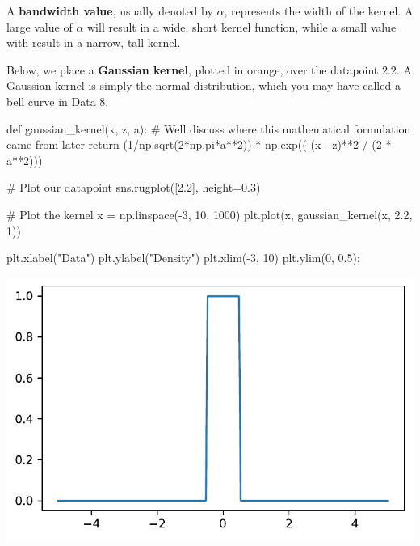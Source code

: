 \documentclass[
  letterpaper,
  DIV=11,
  numbers=noendperiod]{scrreprt}
\newenvironment{Shaded}{\begin{snugshade}}{\end{snugshade}}
\newcommand{\CommentTok}[1]{\textcolor[rgb]{0.37,0.37,0.37}{#1}}
\newcommand{\ControlFlowTok}[1]{\textcolor[rgb]{0.00,0.23,0.31}{#1}}
\newcommand{\DecValTok}[1]{\textcolor[rgb]{0.68,0.00,0.00}{#1}}
\newcommand{\FloatTok}[1]{\textcolor[rgb]{0.68,0.00,0.00}{#1}}
\newcommand{\KeywordTok}[1]{\textcolor[rgb]{0.00,0.23,0.31}{#1}}
\newcommand{\NormalTok}[1]{\textcolor[rgb]{0.00,0.23,0.31}{#1}}
\newcommand{\OperatorTok}[1]{\textcolor[rgb]{0.37,0.37,0.37}{#1}}
\newcommand{\StringTok}[1]{\textcolor[rgb]{0.13,0.47,0.30}{#1}}
\begin{document}
A \textbf{bandwidth value}, usually denoted by \(\alpha\), represents
the width of the kernel. A large value of \(\alpha\) will result in a
wide, short kernel function, while a small value with result in a
narrow, tall kernel.

Below, we place a \textbf{Gaussian kernel}, plotted in orange, over the
datapoint \(2.2\). A Gaussian kernel is simply the normal distribution,
which you may have called a bell curve in Data 8.

\begin{Shaded}
\begin{Highlighting}[]
\KeywordTok{def}\NormalTok{ gaussian\_kernel(x, z, a):}
    \CommentTok{\# We\textquotesingle{}ll discuss where this mathematical formulation came from later}
    \ControlFlowTok{return}\NormalTok{ (}\DecValTok{1}\OperatorTok{/}\NormalTok{np.sqrt(}\DecValTok{2}\OperatorTok{*}\NormalTok{np.pi}\OperatorTok{*}\NormalTok{a}\OperatorTok{**}\DecValTok{2}\NormalTok{)) }\OperatorTok{*}\NormalTok{ np.exp((}\OperatorTok{{-}}\NormalTok{(x }\OperatorTok{{-}}\NormalTok{ z)}\OperatorTok{**}\DecValTok{2} \OperatorTok{/}\NormalTok{ (}\DecValTok{2} \OperatorTok{*}\NormalTok{ a}\OperatorTok{**}\DecValTok{2}\NormalTok{)))}

\CommentTok{\# Plot our datapoint}
\NormalTok{sns.rugplot([}\FloatTok{2.2}\NormalTok{], height}\OperatorTok{=}\FloatTok{0.3}\NormalTok{)}

\CommentTok{\# Plot the kernel}
\NormalTok{x }\OperatorTok{=}\NormalTok{ np.linspace(}\OperatorTok{{-}}\DecValTok{3}\NormalTok{, }\DecValTok{10}\NormalTok{, }\DecValTok{1000}\NormalTok{)}
\NormalTok{plt.plot(x, gaussian\_kernel(x, }\FloatTok{2.2}\NormalTok{, }\DecValTok{1}\NormalTok{))}

\NormalTok{plt.xlabel(}\StringTok{"Data"}\NormalTok{)}
\NormalTok{plt.ylabel(}\StringTok{"Density"}\NormalTok{)}
\NormalTok{plt.xlim(}\OperatorTok{{-}}\DecValTok{3}\NormalTok{, }\DecValTok{10}\NormalTok{)}
\NormalTok{plt.ylim(}\DecValTok{0}\NormalTok{, }\FloatTok{0.5}\NormalTok{)}\OperatorTok{;}
\end{Highlighting}
\end{Shaded}

\includegraphics{visualization_2/visualization_2_files/figure-pdf/cell-6-output-1.pdf}
\end{document}
